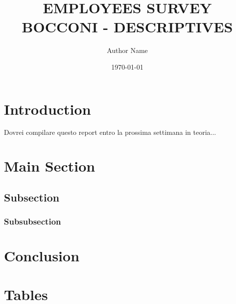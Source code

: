 \documentclass[12pt]{article}
\title{EMPLOYEES SURVEY BOCCONI - DESCRIPTIVES}
\author{Author Name}
\date{\today}
\numberwithin{figure}{section}
\numberwithin{table}{section}
\begin{document}
\maketitle


\section{Introduction}
Dovrei compilare questo report entro la prossima settimana in teoria...

\section{Main Section}



\subsection{Subsection}
\blindtext

\subsubsection{Subsubsection}
\blindtext

\section{Conclusion}
\blindtext

\newpage
\section*{Tables}











\end{document}
